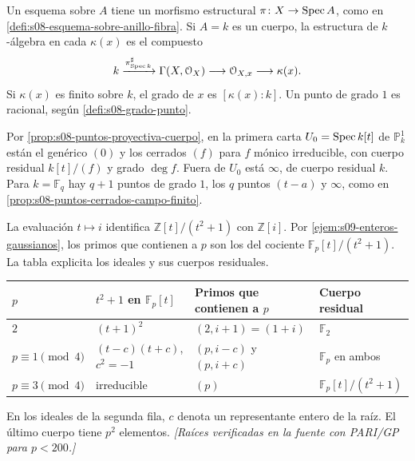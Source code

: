 \begin{defi}
\label{defi:s10-grado-punto}
Un esquema sobre \(A\) tiene un morfismo estructural \(\pi\colon X\to\operatorname{Spec} A\), como en \cref{defi:s08-esquema-sobre-anillo-fibra}. Si \(A=k\) es un cuerpo, la estructura de \(k\)-álgebra en cada \(\kappa(x)\) es el compuesto
\[
 k\xrightarrow{\pi_{\operatorname{Spec} k}^\sharp}\Gamma(X,\mathcal O_X)
 \longrightarrow\mathcal O_{X,x}\longrightarrow\kappa(x).
\]
Si \(\kappa(x)\) es finito sobre \(k\), el grado de \(x\) es \([\kappa(x):k]\). Un punto de grado \(1\) es racional, según \cref{defi:s08-grado-punto}.
\end{defi}

\begin{prop}
\label{prop:s10-puntos-proyectiva}
Por \cref{prop:s08-puntos-proyectiva-cuerpo}, en la primera carta \(U_0=\operatorname{Spec} k[t]\) de \(\mathbb P^1_k\) están el genérico \((0)\) y los cerrados \((f)\) para \(f\) mónico irreducible, con cuerpo residual \(k[t]/(f)\) y grado \(\deg f\). Fuera de \(U_0\) está \(\infty\), de cuerpo residual \(k\). Para \(k=\mathbb F_q\) hay \(q+1\) puntos de grado \(1\), los \(q\) puntos \((t-a)\) y \(\infty\), como en \cref{prop:s08-puntos-cerrados-campo-finito}.
\end{prop}

\begin{ejem}
\label{ejem:s10-primos-gaussianos}
La evaluación \(t\mapsto i\) identifica \(\mathbb Z[t]/(t^2+1)\) con \(\mathbb Z[i]\). Por \cref{ejem:s09-enteros-gaussianos}, los primos que contienen a \(p\) son los del cociente \(\mathbb F_p[t]/(t^2+1)\). La tabla explicita los ideales y sus cuerpos residuales.
\begin{center}
\small
\renewcommand{\arraystretch}{1.2}
\begin{tabular}{@{}llll@{}}
\hline
\(p\) & \(t^2+1\) en \(\mathbb F_p[t]\) & Primos que contienen a \(p\) & Cuerpo residual \\
\hline
\(2\) & \((t+1)^2\) & \((2,i+1)=(1+i)\) & \(\mathbb F_2\) \\
\(p\equiv1\pmod 4\) & \((t-c)(t+c)\), \(c^2=-1\) & \((p,i-c)\) y \((p,i+c)\) & \(\mathbb F_p\) en ambos \\
\(p\equiv3\pmod 4\) & irreducible & \((p)\) & \(\mathbb F_p[t]/(t^2+1)\) \\
\hline
\end{tabular}
\end{center}
En los ideales de la segunda fila, \(c\) denota un representante entero de la raíz. El último cuerpo tiene \(p^2\) elementos. \emph{[Raíces verificadas en la fuente con PARI/GP para \(p<200\).]}
\end{ejem}

